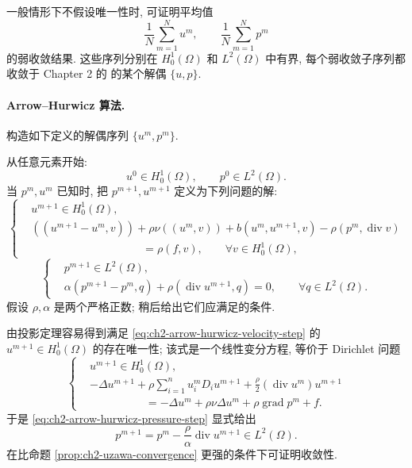 \hypertarget{chapter-02-page-164}{}
\begin{Remark}
\label{rem:ch2-uzawa-nonunique-averages}
一般情形下不假设唯一性时, 可证明平均值
\[
\frac1N\sum_{m=1}^{N}u^m,
\qquad
\frac1N\sum_{m=1}^{N}p^m
\]
的弱收敛结果. 这些序列分别在 $H_0^1(\Omega)$ 和 $L^2(\Omega)$ 中有界, 每个弱收敛子序列都收敛于 Chapter 2 的  的某个解偶 $\{u,p\}$.
\end{Remark}

\paragraph{Arrow--Hurwicz 算法.}
构造如下定义的解偶序列 $\{u^m,p^m\}$.

从任意元素开始:
\begin{equation}
u^0\in H_0^1(\Omega),
\qquad p^0\in L^2(\Omega).
\label{eq:ch2-arrow-hurwicz-initial-data}
\end{equation}
当 $p^m,u^m$ 已知时, 把 $p^{m+1},u^{m+1}$ 定义为下列问题的解:
\begin{equation}
\left\{
\begin{aligned}
&u^{m+1}\in H_0^1(\Omega),\\
&((u^{m+1}-u^m,v))+\rho\nu((u^m,v))
+b(u^m,u^{m+1},v)-\rho(p^m,\operatorname{div}v)\\
&\hspace{10em}=\rho(f,v),
\qquad\forall v\in H_0^1(\Omega),
\end{aligned}
\right.
\label{eq:ch2-arrow-hurwicz-velocity-step}
\end{equation}
\begin{equation}
\left\{
\begin{aligned}
&p^{m+1}\in L^2(\Omega),\\
&\alpha(p^{m+1}-p^m,q)+\rho(\operatorname{div}u^{m+1},q)=0,
\qquad\forall q\in L^2(\Omega).
\end{aligned}
\right.
\label{eq:ch2-arrow-hurwicz-pressure-step}
\end{equation}
假设 $\rho,\alpha$ 是两个严格正数; 稍后给出它们应满足的条件.

由投影定理容易得到满足 \eqref{eq:ch2-arrow-hurwicz-velocity-step} 的 $u^{m+1}\in H_0^1(\Omega)$ 的存在唯一性; 该式是一个线性变分方程, 等价于 Dirichlet 问题
\begin{equation}
\left\{
\begin{aligned}
&u^{m+1}\in H_0^1(\Omega),\\
&-\Delta u^{m+1}+\rho\sum_{i=1}^{n}u_i^mD_iu^{m+1}
+\frac\rho2(\operatorname{div}u^m)u^{m+1}\\
&\hspace{5em}=-\Delta u^m+\rho\nu\Delta u^m+\rho\operatorname{grad}p^m+f.
\end{aligned}
\right.
\label{eq:ch2-arrow-hurwicz-dirichlet-problem}
\end{equation}
于是 \eqref{eq:ch2-arrow-hurwicz-pressure-step} 显式给出
\begin{equation}
p^{m+1}=p^m-\frac\rho\alpha\operatorname{div}u^{m+1}\in L^2(\Omega).
\label{eq:ch2-arrow-hurwicz-explicit-pressure}
\end{equation}
在比命题 \ref{prop:ch2-uzawa-convergence} 更强的条件下可证明收敛性.

